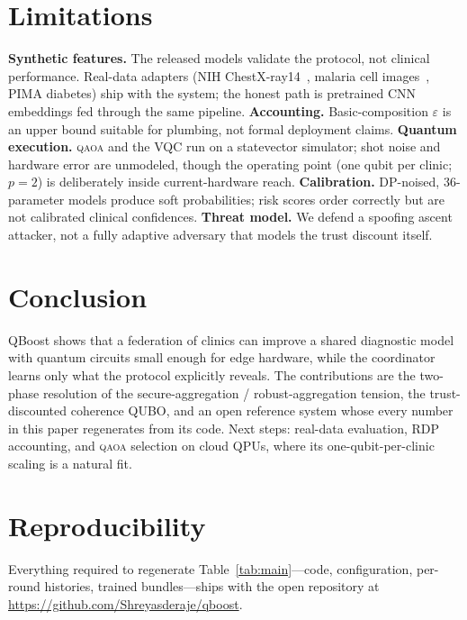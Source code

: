 \documentclass[conference]{IEEEtran}
\newcommand{\qaoa}{\textsc{qaoa}}
\begin{document}
\section{Limitations}
\textbf{Synthetic features.} The released models validate the protocol, not
clinical performance. Real-data adapters (NIH ChestX-ray14~\cite{wang_cxr},
malaria cell images~\cite{rajaraman}, PIMA diabetes) ship with the system;
the honest path is pretrained CNN embeddings fed through the same pipeline.
\textbf{Accounting.} Basic-composition $\varepsilon$ is an upper bound
suitable for plumbing, not formal deployment claims. \textbf{Quantum
execution.} \qaoa{} and the VQC run on a statevector simulator; shot noise and
hardware error are unmodeled, though the operating point (one qubit per
clinic; $p{=}2$) is deliberately inside current-hardware reach.
\textbf{Calibration.} DP-noised, 36-parameter models produce soft
probabilities; risk scores order correctly but are not calibrated clinical
confidences. \textbf{Threat model.} We defend a spoofing ascent attacker, not
a fully adaptive adversary that models the trust discount itself.

\section{Conclusion}
QBoost shows that a federation of clinics can improve a shared diagnostic
model with quantum circuits small enough for edge hardware, while the
coordinator learns only what the protocol explicitly reveals. The
contributions are the two-phase resolution of the secure-aggregation /
robust-aggregation tension, the trust-discounted coherence QUBO, and an open
reference system whose every number in this paper regenerates from its code.
Next steps: real-data evaluation, RDP accounting, and \qaoa{} selection on
cloud QPUs, where its one-qubit-per-clinic scaling is a natural fit.

\section*{Reproducibility}
Everything required to regenerate Table~\ref{tab:main}---code,
configuration, per-round histories, trained bundles---ships with the open
repository at \url{https://github.com/Shreyasderaje/qboost}.

\end{document}
